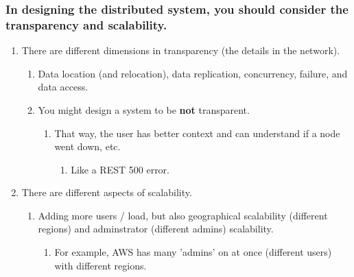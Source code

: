 \documentclass[11pt]{article}
\begin{document}
\subsubsection{In designing the distributed system, you should consider the transparency and scalability.}
\label{sec-1-1-2}
\begin{enumerate}
\item There are different dimensions in transparency (the details in the network).
\label{sec-1-1-2-1}
\begin{enumerate}
\item Data location (and relocation), data replication, concurrency, failure, and data access.
\label{sec-1-1-2-1-1}
\item You might design a system to be \textbf{not} transparent.
\label{sec-1-1-2-1-2}
\begin{enumerate}
\item That way, the user has better context and can understand if a node went down, etc.
\label{sec-1-1-2-1-2-1}
\begin{enumerate}
\item Like a REST 500 error.
\label{sec-1-1-2-1-2-1-1}
\end{enumerate}
\end{enumerate}
\end{enumerate}
\item There are different aspects of scalability.
\label{sec-1-1-2-2}
\begin{enumerate}
\item Adding more users / load, but also geographical scalability (different regions) and adminstrator (different admins) scalability.
\label{sec-1-1-2-2-1}
\begin{enumerate}
\item For example, AWS has many 'admins' on at once (different users) with different regions.
\label{sec-1-1-2-2-1-1}
\end{enumerate}
\end{enumerate}
\end{enumerate}
\end{document}
